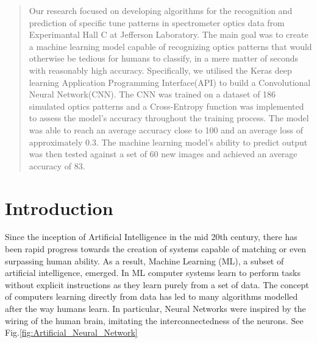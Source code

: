 \documentclass[conference]{IEEEtran}
\begin{document}
\begin{abstract}
Our research focused on developing algorithms for the recognition and prediction of specific tune patterns in spectrometer optics data from Experimantal Hall C at Jefferson Laboratory. The main goal was to create a machine learning model capable of recognizing optics patterns that would otherwise be tedious for humans to classify, in a mere matter of seconds with reasonably high accuracy. Specifically, we utilised the Keras deep learning Application Programming Interface(API) to build a Convolutional Neural Network(CNN). The CNN was trained on a dataset of 186 simulated optics patterns and a Cross-Entropy function was implemented to assess the model's accuracy throughout the training process. The model was able to reach an average accuracy close to 100\text{\%} and an average loss of approximately 0.3. The machine learning model's ability to predict output was then tested against a set of 60 new images and achieved an average accuracy of 83\text{\%}.  
\end{abstract}


\section{Introduction}
Since the inception of Artificial Intelligence in the mid 20th century, there has been rapid progress towards the creation of systems capable of matching or even surpassing human ability. As a result, Machine Learning (ML), a subset of artificial intelligence, emerged. In ML computer systems learn to perform tasks without explicit instructions as they learn purely from a set of data. The concept of computers learning directly from data has led to many algorithms modelled after the way humans learn. In particular, Neural Networks were inspired by the wiring of the human brain, imitating the interconnectedness of the neurons.
 See Fig.\ref{fig:Artificial_Neural_Network}
\end{document}
